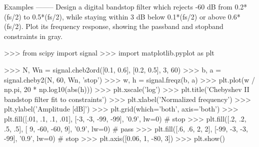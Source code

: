 \begin{DoxyVerb}
Examples
--------
Design a digital bandstop filter which rejects -60 dB from 0.2*(fs/2) to
0.5*(fs/2), while staying within 3 dB below 0.1*(fs/2) or above
0.6*(fs/2).  Plot its frequency response, showing the passband and
stopband constraints in gray.

>>> from scipy import signal
>>> import matplotlib.pyplot as plt

>>> N, Wn = signal.cheb2ord([0.1, 0.6], [0.2, 0.5], 3, 60)
>>> b, a = signal.cheby2(N, 60, Wn, 'stop')
>>> w, h = signal.freqz(b, a)
>>> plt.plot(w / np.pi, 20 * np.log10(abs(h)))
>>> plt.xscale('log')
>>> plt.title('Chebyshev II bandstop filter fit to constraints')
>>> plt.xlabel('Normalized frequency')
>>> plt.ylabel('Amplitude [dB]')
>>> plt.grid(which='both', axis='both')
>>> plt.fill([.01, .1, .1, .01], [-3,  -3, -99, -99], '0.9', lw=0) # stop
>>> plt.fill([.2,  .2, .5,  .5], [ 9, -60, -60,   9], '0.9', lw=0) # pass
>>> plt.fill([.6,  .6,  2,   2], [-99, -3,  -3, -99], '0.9', lw=0) # stop
>>> plt.axis([0.06, 1, -80, 3])
>>> plt.show()\end{DoxyVerb}
 \hypertarget{namespacescipy_1_1signal_1_1filter__design_a9fa81c48e581756829873cce264fbc67}{}
